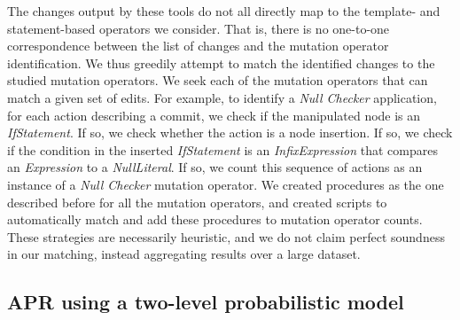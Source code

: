 \documentclass[conference]{IEEEtran}
\begin{document}
The changes output by these tools do not all directly map to the template- and
statement-based operators we consider.  That is, there is no one-to-one
correspondence between the list of changes and the mutation operator
identification. We thus greedily attempt to match the identified changes to the 
studied
mutation operators. We seek each of the mutation operators that 
can match a given set
of edits.  For example, to identify
a \emph{Null Checker} application, for each action describing a commit, we check
if the manipulated node
is an \emph{IfStatement}.  If so, we check whether the action
is a node insertion.  If so, we check if the condition in the inserted
\emph{IfStatement} is an 
\emph{InfixExpression} that compares an 
\emph{Expression} to a
\emph{NullLiteral}. If so, we count this sequence of
actions as an instance of a \emph{Null Checker} mutation operator. We
created procedures as the one described before for all the mutation operators,
and created scripts to automatically match and add these procedures to mutation
operator counts.
These strategies are
necessarily heuristic, and we do not claim perfect soundness in our matching,
instead aggregating results over a large dataset.  






\subsection{APR using a two-level probabilistic model}
\label{sec:modelrepair} 
\end{document}
